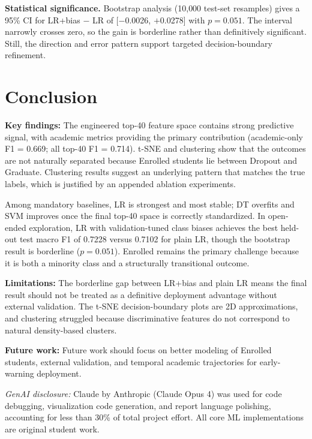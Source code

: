 \documentclass{article}
\begin{document}
\textbf{Statistical significance.} Bootstrap analysis (10{,}000 test-set resamples) gives a 95\% CI for LR+bias $-$ LR of [$-$0.0026, $+$0.0278] with $p = 0.051$. The interval narrowly crosses zero, so the gain is borderline rather than definitively significant. Still, the direction and error pattern support targeted decision-boundary refinement.

\section{Conclusion}

\textbf{Key findings:} The engineered top-40 feature space contains strong predictive signal, with academic metrics providing the primary contribution (academic-only F1 = 0.669; all top-40 F1 = 0.714). t-SNE and clustering show that the outcomes are not naturally separated because Enrolled students lie between Dropout and Graduate. Clustering results suggest an underlying pattern that matches the true labels, which is justified by an appended ablation experiments.

Among mandatory baselines, LR is strongest and most stable; DT overfits and SVM improves once the final top-40 space is correctly standardized. In open-ended exploration, LR with validation-tuned class biases achieves the best held-out test macro F1 of 0.7228 versus 0.7102 for plain LR, though the bootstrap result is borderline ($p = 0.051$). Enrolled remains the primary challenge because it is both a minority class and a structurally transitional outcome.

\textbf{Limitations:} The borderline gap between LR+bias and plain LR means the final result should not be treated as a definitive deployment advantage without external validation. The t-SNE decision-boundary plots are 2D approximations, and clustering struggled because discriminative features do not correspond to natural density-based clusters.

\textbf{Future work:} Future work should focus on better modeling of Enrolled students, external validation, and temporal academic trajectories for early-warning deployment.




\noindent\textit{GenAI disclosure:} Claude by Anthropic (Claude Opus 4) was used for code debugging, visualization code generation, and report language polishing, accounting for less than 30\% of total project effort. All core ML implementations are original student work.
\end{document}
